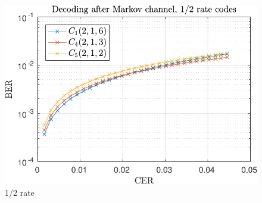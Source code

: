 \begin{figure}
\centering
\includegraphics[scale=1]{../figures/extra12markov.pdf} 
\caption{1/2 rate\label{fig:constantCodeRateMarkovFigure}}
\end{figure}
